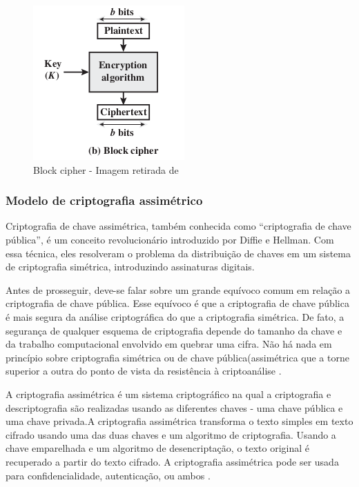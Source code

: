                 \begin{figure}[H]
                     \centering
                     \includegraphics[scale=0.7]{figuras/capitulo_2/block_cipher.png}
                     \caption{Block cipher - Imagem retirada de \cite{cryptograpy_and_network_stallings}}
                     \label{fig:imagem_block_cipher}
                \end{figure}
            
            
        \subsubsection{Modelo de criptografia assimétrico}
        
                Criptografia de chave assimétrica, também conhecida como “criptografia de chave pública”, é um conceito revolucionário introduzido por Diffie e Hellman. Com essa técnica, eles resolveram o problema da distribuição de chaves em um sistema de criptografia simétrica, introduzindo assinaturas digitais.\cite{beginnig_blockchain_bikramaditya}
                
                Antes de prosseguir, deve-se falar sobre um grande equívoco comum em relação a criptografia de chave pública. Esse equívoco é que a criptografia de chave pública é mais segura da análise criptográfica do que a criptografia simétrica. De fato, a segurança de qualquer esquema de criptografia depende do tamanho da chave e da trabalho computacional envolvido em quebrar uma cifra. Não há nada em princípio sobre criptografia simétrica ou de chave pública(assimétrica que a torne superior a outra do ponto de vista da resistência à criptoanálise \cite{cryptograpy_and_network_stallings}.

                A criptografia assimétrica é um sistema criptográfico na qual a criptografia
                e descriptografia são realizadas usando as diferentes chaves - uma chave pública e uma chave privada.A criptografia assimétrica transforma o texto simples em texto cifrado usando uma das duas chaves e um algoritmo de criptografia. Usando a chave emparelhada e um algoritmo de desencriptação, o texto original é recuperado a partir do texto cifrado. A criptografia assimétrica pode ser usada para confidencialidade, autenticação, ou ambos   \cite{cryptograpy_and_network_stallings}.

